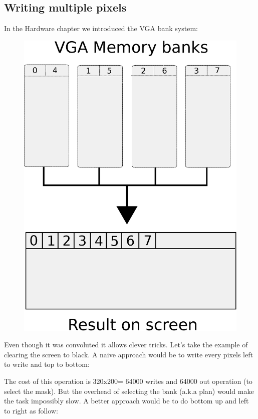 \subsection{Writing multiple pixels}
In the Hardware chapter we introduced the VGA bank system:
\begin{figure}[H]
\centering
\includegraphics[scale=0.5]{imgs/vga_ram_screen_layout.eps}
\end{figure}

Even though it was convoluted it allows clever tricks. Let's take the example of clearing the screen to black. A naive approach would be to write every pixels left to write and top to bottom:




The cost of this operation is 320x200= 64000 writes and 64000 out operation (to select the mask).
But the overhead of selecting the bank (a.k.a plan) would make the task impossibly slow. A better approach would be to do bottom up and left to right as follow:

